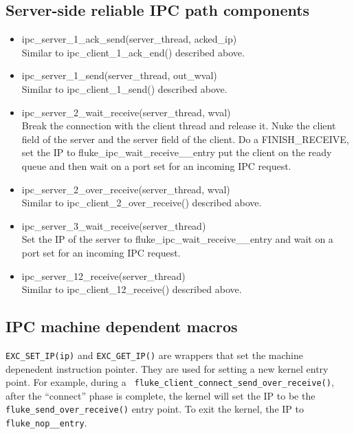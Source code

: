 \subsection{Server-side reliable IPC path components}
\begin{itemize}
\item ipc_server_1_ack_send(server_thread, acked_ip)\\
 Similar to ipc_client_1_ack_end() described above.

\item ipc_server_1_send(server_thread, out_wval)\\
 Similar to ipc_client_1_send() described above.

\item ipc_server_2_wait_receive(server_thread, wval)\\
 Break the connection with the client thread and release it. Nuke the
 client field of the server and the server field of the client. Do a
 FINISH_RECEIVE, set the IP to fluke_ipc_wait_receive__entry
 put the client on the ready queue and then 
 wait on a port set for an incoming IPC request.

\item ipc_server_2_over_receive(server_thread, wval)\\
 Similar to ipc_client_2_over_receive() described above.

\item ipc_server_3_wait_receive(server_thread)\\
 Set the IP of the server to fluke_ipc_wait_receive__entry and wait
 on a port set for an incoming IPC request.

\item ipc_server_12_receive(server_thread)\\
 Similar to ipc_client_12_receive() described above.
\end{itemize}

\subsection{IPC machine dependent macros}

{\tt EXC_SET_IP(ip)} and {\tt EXC_GET_IP()} are wrappers that set the
machine depenedent instruction pointer.  They are used for setting a
new kernel entry point.  For example, during a {\tt
fluke_client_connect_send_over_receive()}, after the ``connect'' phase
is complete, the kernel will set the IP to be the {\tt
fluke_send_over_receive()} entry point.  To exit the kernel, 
the IP to {\tt fluke_nop__entry}.

